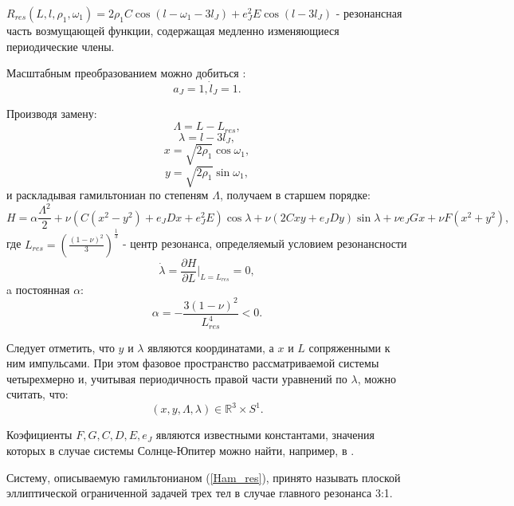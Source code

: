 $R_{res}(L,l,\rho_1,\omega_1) = 2 \rho_1 C \cos(l-\omega_1-3 l_J)+e_J^2E \cos(l - 3 l_J)$ - резонансная часть возмущающей функции, содержащая медленно изменяющиеся периодические члены.

Масштабным преобразованием можно добиться  \cite{wis2}:
$$a_J=1, \dot l_J= 1 .$$

Производя замену:
$$\Lambda = L - L_{res},$$
$$\lambda = l - 3 l_J,$$
$$x = \sqrt{2 \rho_1} \cos \omega_1,$$
$$y = \sqrt{2 \rho_1} \sin \omega_1,$$
и раскладывая гамильтониан по степеням $\Lambda$, получаем в старшем порядке:
\begin{equation}
\label{Ham_res}
H = \alpha \frac{\Lambda^2}{2} + \nu \left( C(x^2-y^2)+e_J D x + e_J^2 E \right) \cos \lambda + \nu (2Cxy+e_J D y) \sin \lambda + \nu e_J G x + \nu F(x^2+y^2),
\end{equation}
где $L_{res} = \left( \frac{(1-\nu)^2}{3} \right)^\frac13$ - центр резонанса, определяемый условием резонансности 
$$
\dot \lambda = \frac{\partial H}{\partial L}|_{L=L_{res}}=0,$$
a постоянная $\alpha$: 
$$\alpha = -\frac{3(1-\nu)^2}{L_{res}^4} < 0.$$

Следует отметить, что $y$ и $\lambda$ являются координатами, а $x$ и $L$ сопряженными к ним импульсами. При этом фазовое пространство рассматриваемой системы  четырехмерно и, учитывая периодичность правой части уравнений по $\lambda$, можно считать, что:
$$(x,y,\Lambda,\lambda) \in \mathbb{R}^3 \times S^1 .$$

Коэфициенты $F,G,C,D,E,e_J$ являются известными константами, значения которых в случае системы Солнце-Юпитер можно найти, например, в \cite{wis1}.

Систему, описываемую гамильтонианом (\ref{Ham_res}), принято называть плоской эллиптической ограниченной задачей трех тел в случае главного резонанса 3:1.